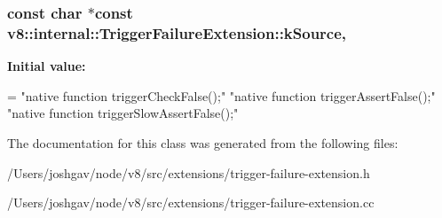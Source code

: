 \subsubsection[{\texorpdfstring{k\+Source}{kSource}}]{\setlength{\rightskip}{0pt plus 5cm}const char $\ast$const v8\+::internal\+::\+Trigger\+Failure\+Extension\+::k\+Source\hspace{0.3cm}{\ttfamily [static]}, {\ttfamily [private]}}\hypertarget{classv8_1_1internal_1_1_trigger_failure_extension_a276d620a88aebb9bdb0ad47d9e62c9cb}{}\label{classv8_1_1internal_1_1_trigger_failure_extension_a276d620a88aebb9bdb0ad47d9e62c9cb}
{\bfseries Initial value\+:}
\begin{DoxyCode}
=
    \textcolor{stringliteral}{"native function triggerCheckFalse();"}
    \textcolor{stringliteral}{"native function triggerAssertFalse();"}
    \textcolor{stringliteral}{"native function triggerSlowAssertFalse();"}
\end{DoxyCode}


The documentation for this class was generated from the following files\+:\begin{DoxyCompactItemize}
\item 
/\+Users/joshgav/node/v8/src/extensions/trigger-\/failure-\/extension.\+h\item 
/\+Users/joshgav/node/v8/src/extensions/trigger-\/failure-\/extension.\+cc\end{DoxyCompactItemize}
